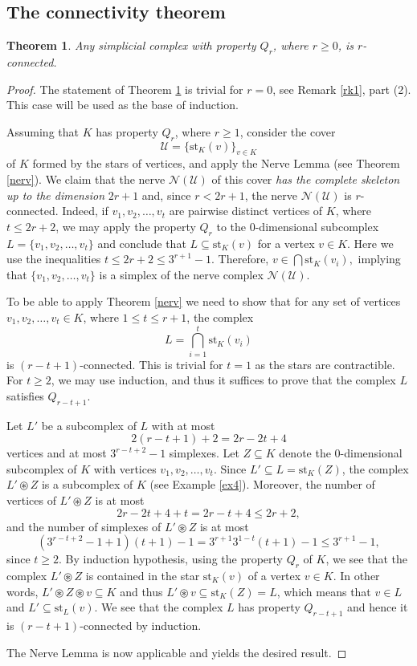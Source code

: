 \documentclass[10pt,a4paper]{amsart}
\newtheorem{teo}[lema]{Theorem}
\newcommand{\st}{\textrm{st}}
\DeclareMathOperator{\join}{\circledast}
\begin{document}
\subsection{The connectivity theorem} 
\begin{teo} \label{thm:6} Any simplicial complex with property $Q_r$, where $r\ge 0$, is $r$-connected.
\end{teo}
\begin{proof}
The statement of Theorem \ref{thm:6} is trivial for $r=0$, see Remark \ref{rk1}, part (2). 
This case will be used as the base of induction. 

Assuming that $K$ has property $Q_r$, where $r\ge 1$, consider the cover 
$$
\mathcal{U}=\{\st_K(v)\}_{v\in K}$$
of $K$ formed by the stars of vertices, and apply the Nerve Lemma (see Theorem \ref{nerv}). 
We claim that the nerve $\mathcal N(\mathcal{U})$ of this cover {\it has the complete skeleton up to the dimension} $2r+1$ and, 
since $r<2r+1$, 
the nerve $\mathcal N(\mathcal{U})$ is $r$-connected.
Indeed, if $v_1, v_2, \ldots, v_t$ are pairwise distinct vertices of $K$, where $t\le 2r+2$, we may apply the property $Q_r$ to the 0-dimensional subcomplex 
$L=\{v_1, v_2, \ldots, v_t\}$ and conclude that $L\subseteq \st_K(v)$ for a vertex $v\in K$. Here we use the inequalities
$t\le 2r+2\le 3^{r+1}-1.$
Therefore, $v\in  \bigcap \st_K(v_i),$ implying that $\{v_1, v_2, \dots, v_t\}$
is a simplex of the nerve complex 
$\mathcal N(\mathcal{U})$.
    

To be able to apply Theorem \ref{nerv} we need to show that for any set of vertices $v_1,v_2,\ldots, v_t \in K$, where 
$1\le t\le r+1$, the complex 
$$L=\bigcap_{i=1}^t \st_K(v_i)$$
is $(r-t+1)$-connected. This is trivial  for $t=1$ as the stars are contractible. 
For $t\ge 2$, we may use induction, and thus it suffices to prove that the complex $L$ satisfies $Q_{r-t+1}$. 

Let $L'$ be a subcomplex of $L$ with at most $$2(r-t+1)+2=2r-2t+4$$ vertices and at most $3^{r-t+2}-1$ simplexes. Let $Z\subseteq K$ denote the 0-dimensional subcomplex of $K$ with vertices $v_1,v_2,\ldots, v_t$. Since $L'\subseteq L=\st_K(Z)$, the complex $L'\join Z$ is a subcomplex of $K$ (see Example \ref{ex4}). Moreover, the number of vertices of $L'\join Z$ is at most $$2r-2t+4+t=2r-t+4\le 2r+2,$$ and the number of simplexes of $L'\join Z$
is at most $$(3^{r-t+2}-1+1)(t+1)-1=3^{r+1}3^{1-t}(t+1)-1\le 3^{r+1}-1,$$ since $t\ge 2$. By induction hypothesis, using the property $Q_r$ of $K$, we see that the complex $L'\join Z$ is contained in the star $\st_K(v)$ of a vertex $v\in K$. In other words, $L'\join Z\join v \subseteq K$ and thus 
$L'\join v \subseteq \st_K(Z)=L$, which means that $v\in L$ and $L' \subseteq \st_L(v)$. We see that the complex $L$ has property $Q_{r-t+1}$ and hence it is $(r-t+1)$-connected by induction. 

The Nerve Lemma is now applicable and yields the desired result. 
\end{proof}
\end{document}
